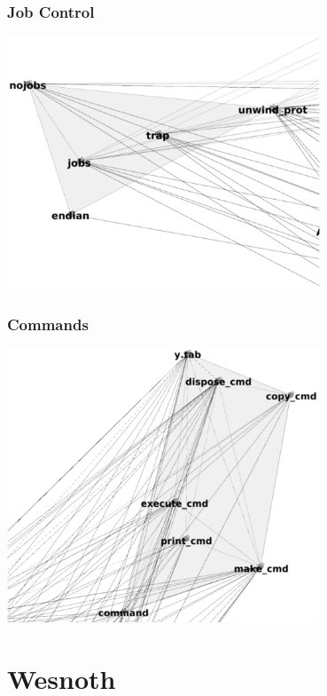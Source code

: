\documentclass{../mcsslides}
\begin{document}
    \begin{frame}
        \frametitle{Job Control}
        \begin{center}
            \includegraphics[width=0.7\textwidth]{bashJobControl.png}
        \end{center}
    \end{frame}

    \begin{frame}
        \frametitle{Commands}
        \begin{center}
            \includegraphics[width=0.7\textwidth]{bashCommands.png}
        \end{center}
    \end{frame}

    \section{Wesnoth}
\end{document}
